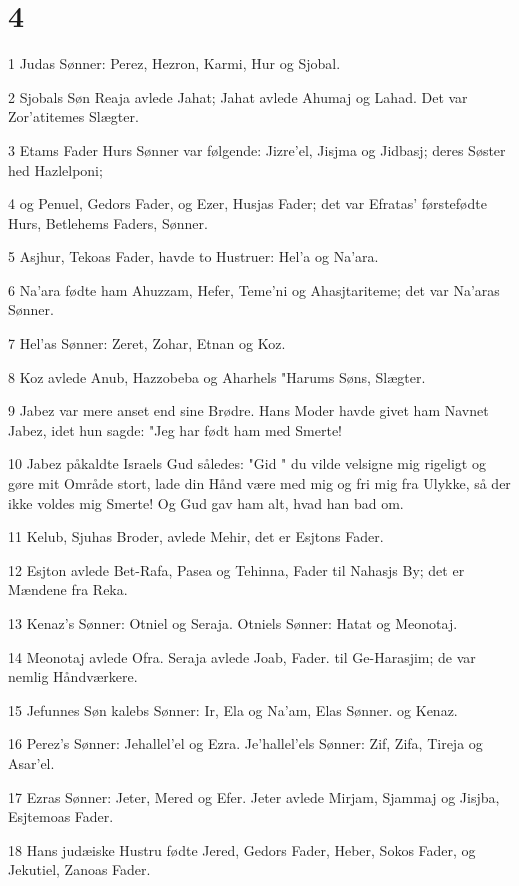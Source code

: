 \chapter{4}

\par 1 Judas Sønner: Perez, Hezron, Karmi, Hur og Sjobal.
\par 2 Sjobals Søn Reaja avlede Jahat; Jahat avlede Ahumaj og Lahad. Det var Zor'atitemes Slægter.
\par 3 Etams Fader Hurs Sønner var følgende: Jizre'el, Jisjma og Jidbasj; deres Søster hed Hazlelponi;
\par 4 og Penuel, Gedors Fader, og Ezer, Husjas Fader; det var Efratas' førstefødte Hurs, Betlehems Faders, Sønner.
\par 5 Asjhur, Tekoas Fader, havde to Hustruer: Hel'a og Na'ara.
\par 6 Na'ara fødte ham Ahuzzam, Hefer, Teme'ni og Ahasjtariteme; det var Na'aras Sønner.
\par 7 Hel'as Sønner: Zeret, Zohar, Etnan og Koz.
\par 8 Koz avlede Anub, Hazzobeba og Aharhels "Harums Søns, Slægter.
\par 9 Jabez var mere anset end sine Brødre. Hans Moder havde givet ham Navnet Jabez, idet hun sagde: "Jeg har født ham med Smerte!
\par 10 Jabez påkaldte Israels Gud således: "Gid " du vilde velsigne mig rigeligt og gøre mit Område stort, lade din Hånd være med mig og fri mig fra Ulykke, så der ikke voldes mig Smerte! Og Gud gav ham alt, hvad han bad om.
\par 11 Kelub, Sjuhas Broder, avlede Mehir, det er Esjtons Fader.
\par 12 Esjton avlede Bet-Rafa, Pasea og Tehinna, Fader til Nahasjs By; det er Mændene fra Reka.
\par 13 Kenaz's Sønner: Otniel og Seraja. Otniels Sønner: Hatat og Meonotaj.
\par 14 Meonotaj avlede Ofra. Seraja avlede Joab, Fader. til Ge-Harasjim; de var nemlig Håndværkere.
\par 15 Jefunnes Søn kalebs Sønner: Ir, Ela og Na'am, Elas Sønner. og Kenaz.
\par 16 Perez's Sønner: Jehallel'el og Ezra. Je'hallel'els Sønner: Zif, Zifa, Tireja og Asar'el.
\par 17 Ezras Sønner: Jeter, Mered og Efer. Jeter avlede Mirjam, Sjammaj og Jisjba, Esjtemoas Fader.
\par 18 Hans judæiske Hustru fødte Jered, Gedors Fader, Heber, Sokos Fader, og Jekutiel, Zanoas Fader.
